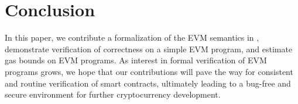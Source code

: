 \section{Conclusion}
In this paper, we contribute a formalization of the EVM semantics in \K{},
demonstrate verification of correctness on a simple EVM program, and estimate
gas bounds on EVM programs. As interest in formal verification of EVM programs
grows, we hope that our contributions will pave the way for consistent and
routine verification of smart contracts, ultimately leading to a bug-free and
secure environment for further cryptocurrency development.
